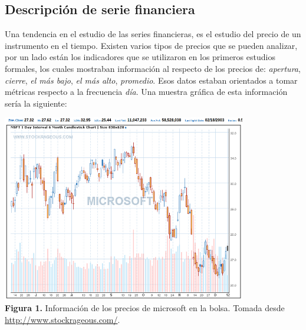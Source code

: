 \subsection{Descripción de serie financiera}

Una tendencia en el estudio de las series financieras, es el estudio del precio de un instrumento en el tiempo.
Existen varios tipos de precios que se pueden analizar, por un lado están los indicadores que se utilizaron en los primeros estudios formales, los cuales 
mostraban información al respecto de los precios de: \emph{apertura}, \emph{cierre}, \emph{el más bajo}, \emph{el más alto}, \emph{promedio}. Esos datos 
estaban orientados a tomar métricas respecto a la frecuencia \emph{día}. Una muestra gráfica de esta información sería la siguiente:

\begin{center}
	\includegraphics[width=0.8\textwidth]{images/microsoft} \\
	\textbf{Figura 1.} Información de los precios de microsoft en la bolsa. Tomada desde \url{http://www.stockrageous.com/}.
\end{center}

